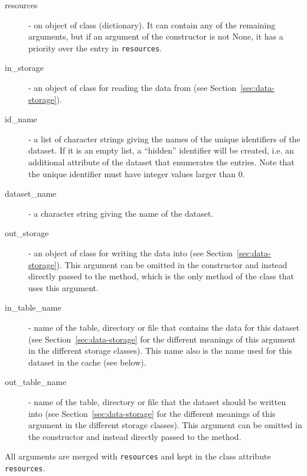\begin{description}
\item[resources]  - on object of class  (dictionary). It can
  contain any of the remaining arguments, but if an argument of the
  constructor is not None, it has a priority over the entry in
  \verb|resources|.
\item[in_storage]  - an object of class  for reading the data
  from (see Section~\ref{sec:data-storage}).
\item[id_name]  - a list of character strings giving the names of the unique
  identifiers of the dataset. If it is an empty list, a ``hidden'' identifier
  will be created, i.e. an additional attribute of the dataset that enumerates the entries. Note that the unique identifier 
  must have integer values larger than 0.
\item[dataset_name]  - a character string giving the name of the dataset. 
\item[out_storage]  - an object of class  for writing the data
  into (see Section~\ref{sec:data-storage}). This argument can be omitted in
  the constructor and instead directly passed to the
   method, which is the only method of the class that uses this argument.
\item[in_table_name]  - name of the table, directory or file that contains the
  data for this dataset (see Section~\ref{sec:data-storage} for the different
  meanings of this argument in the different storage classes).  This name also is the
  name used for this dataset in the cache (see below).
\item[out_table_name]  - name of the table, directory or file that the dataset 
  should be written into (see Section~\ref{sec:data-storage} for the different
  meanings of this argument in the different storage classes). This argument
  can be omitted in the constructor and instead directly passed to the
   method.
\end{description}

All arguments are merged with \verb|resources| and kept in the class attribute
\verb|resources|.

